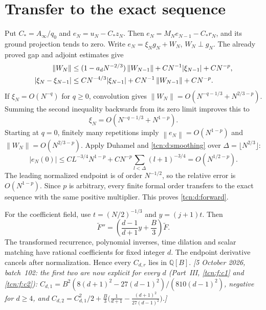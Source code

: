 \documentclass[11pt,letterpaper]{article}
\newcommand{\norm}[1]{\left\lVert#1\right\rVert}
\theoremstyle{remark}
\begin{document}
\section{Transfer to the exact sequence}\label{tcn:d:sec:transfer}
Put $C_\ast=A_\infty/q_0$ and $e_N=u_N-C_\ast z_N$. Then $e_N=M_Ne_{N-1}-C_\ast r_N$, and its ground projection tends to zero. Write $e_N=\xi_Ng_N+W_N$, $W_N\perp g_N$. The already proved gap and adjoint estimates give
\begin{align}\label{tcn:d:boot}
 \norm{W_N}&\le(1-a_dN^{-2/3})\norm{W_{N-1}}
        +CN^{-1}|\xi_{N-1}|+CN^{-p},\notag\\
 |\xi_N-\xi_{N-1}|&\le CN^{-4/3}|\xi_{N-1}|
        +CN^{-1}\norm{W_{N-1}}+CN^{-p}.
\end{align}
If $\xi_N=O(N^{-q})$ for $q\ge0$, convolution gives
$\norm{W_N}=O(N^{-q-1/3}+N^{2/3-p})$. Summing the second inequality backwards from its zero limit improves this to
\[
 \xi_N=O(N^{-q-1/3}+N^{1-p}).
\]
Starting at $q=0$, finitely many repetitions imply $\norm{e_N}=O(N^{1-p})$ and $\norm{W_N}=O(N^{2/3-p})$. Apply Duhamel and \eqref{tcn:d:smoothing} over $\Delta=\lfloor N^{2/3}\rfloor$:
\[
 |e_N(0)|\le CL^{-3/4}N^{1-p}
       +CN^{-p}\sum_{l<\Delta}(l+1)^{-3/4}=O(N^{1/2-p}).
\]
The leading normalized endpoint is of order $N^{-1/2}$, so the relative error is $O(N^{1-p})$. Since $p$ is arbitrary, every finite formal order transfers to the exact sequence with the same positive multiplier. This proves \eqref{tcn:d:forward}.

For the coefficient field, use $t=(N/2)^{-1/3}$ and $y=(j+1)t$. Then
\[
 \widetilde F''=\left(\frac{d-1}{d+1}y+\frac B3\right)\widetilde F.
\]
The transformed recurrence, polynomial inverses, time dilation and scalar matching have rational coefficients for fixed integer $d$. The endpoint derivative cancels after normalization. Hence every $C_{d,r}$ lies in $\mathbb Q[B]$.
\emph{[5 October 2026, batch~102: the first two are now explicit for every $d$ (Part~III, \eqref{tcn:f:c1} and \eqref{tcn:f:c2}): $C_{d,1}=B^2(8(d+1)^2-27(d-1)^2)/(810(d-1)^2)$, negative for $d\ge4$, and $C_{d,2}=C_{d,1}^2/2+\frac B3\bigl(\frac1{d+1}-\frac{(d+1)^2}{27(d-1)^2}\bigr)$.]}
\end{document}
